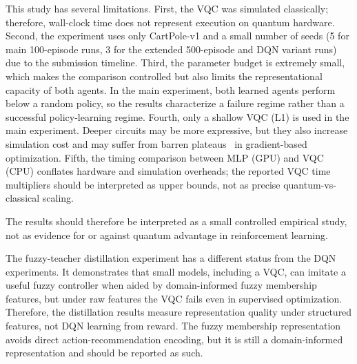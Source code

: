 This study has several limitations. First, the VQC was simulated classically;
therefore, wall-clock time does not represent execution on quantum hardware.
Second, the experiment uses only CartPole-v1 and a small number of seeds
(5 for main 100-episode runs, 3 for the extended 500-episode and DQN variant
runs) due to the submission timeline. Third, the parameter budget is extremely small, which
makes the comparison controlled but also limits the representational capacity
of both agents. In the main experiment, both learned agents perform below a
random policy, so the results characterize a failure regime rather than a
successful policy-learning regime. Fourth, only a shallow VQC (L1) is used in
the main experiment. Deeper circuits may be more expressive, but they also
increase simulation cost and may suffer from barren plateaus~\cite{mcclean2018barren,cerezo2021cost}
in gradient-based optimization. Fifth, the timing comparison between MLP
(GPU) and VQC (CPU) conflates hardware and simulation overheads; the reported
VQC time multipliers should be interpreted as upper bounds, not as precise
quantum-vs-classical scaling.

The results should therefore be interpreted as a small controlled empirical
study, not as evidence for or against quantum advantage in reinforcement
learning.

The fuzzy-teacher distillation experiment has a different status from the DQN
experiments. It demonstrates that small models, including a VQC, can imitate a
useful fuzzy controller when aided by domain-informed fuzzy membership features,
but under raw features the VQC fails even in supervised optimization. Therefore,
the distillation results measure representation quality under structured
features, not DQN learning from reward. The fuzzy membership representation
avoids direct action-recommendation encoding, but it is still a domain-informed
representation and should be reported as such.

